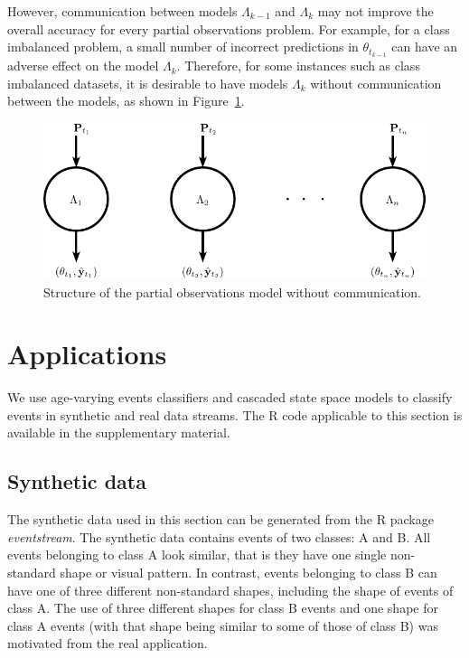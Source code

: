 \documentclass[a4paper,11pt]{article}
\begin{document}
However, communication between models $\Lambda_{k-1}$ and $\Lambda_k$ may not improve the overall accuracy for every partial observations problem. For example, for a class imbalanced problem, a small number of incorrect predictions in $\theta_{t_{k-1}}$ can have an adverse effect on the model $\Lambda_k$. Therefore, for some instances such as class imbalanced datasets, it is desirable to have models $\Lambda_k$ without communication between the models, as shown in Figure~\ref{fig:PODLM2}.

\begin{figure}[!hb]
	\centering
	\includegraphics[clip=true,scale=0.8]{./Graphics/Lots_of_circles_4.pdf}
	\caption{Structure of the partial observations model without communication.}
	\label{fig:PODLM2}
\end{figure}


\section{Applications}\label{sec:Experiments}

We use age-varying events classifiers and cascaded state space models to classify events in synthetic and real data streams. The R code applicable to this section is available in the supplementary material.

\subsection{Synthetic data}\label{subsec:Synthetic}

The synthetic data used in this section can be generated from the R package \textit{eventstream}. The synthetic data contains events of two classes: A and B. All events belonging to class A look similar, that is they have one single non-standard shape or visual pattern. In contrast, events belonging to class B can have one of three different non-standard shapes, including the shape of events of class A. The use of three different shapes for class B events and one shape for class A events (with that shape being similar to some of those of class B) was motivated from the real application.
\end{document}
